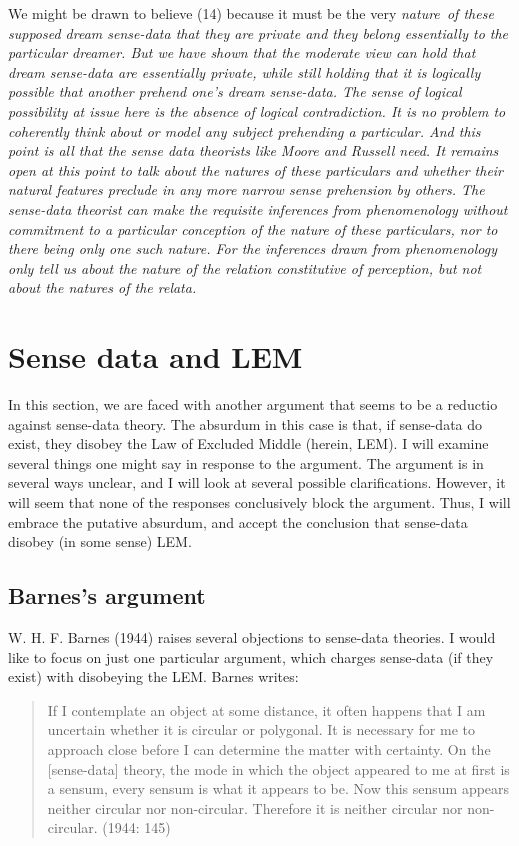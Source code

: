We might be drawn to believe (14) because it must be the very \em nature\em\ of these supposed dream sense-data that they are private and they belong essentially to the particular dreamer. But we have shown that the moderate view can hold that dream sense-data are essentially private, while still holding that it is logically possible that another prehend one's dream sense-data. The sense of logical possibility at issue here is the absence of logical contradiction. It is no problem to coherently think about or model any subject prehending a particular. And this point is all that the sense data theorists like Moore and Russell need. It remains open at this point to talk about the natures of these particulars and whether their natural features preclude in any more narrow sense prehension by others. The sense-data theorist can make the requisite inferences from phenomenology without commitment to a particular conception of the nature of these particulars, nor to there being only one such nature. For the inferences drawn from phenomenology only tell us about the nature of the relation constitutive of perception, but not about the natures of the relata.




\section{Sense data and LEM}\label{sdandlem}
In this section, we are faced with another argument that seems to be a reductio against sense-data theory. The absurdum in this case is that, if sense-data do exist, they disobey the Law of Excluded Middle (herein, LEM). I will examine several things one might say in response to the argument. The argument is in several ways unclear, and I will look at several possible clarifications. However, it will seem that none of the responses conclusively block the argument. Thus, I will embrace the putative absurdum, and accept the conclusion that sense-data disobey (in some sense) LEM. 

\subsection{Barnes's argument}

W. H. F. Barnes (1944) raises several objections to sense-data theories. I would like to focus on just one particular argument, which charges sense-data (if they exist) with disobeying the LEM. Barnes writes:

\begin{quote}
If I contemplate an object at some distance, it often happens that I am uncertain whether it is circular or polygonal. It is necessary for me to approach close before I can determine the matter with certainty. On the [sense-data] theory, the mode in which the object appeared to me at first is a sensum, every sensum is what it appears to be. Now this sensum appears neither circular nor non-circular. Therefore it is neither circular nor non-circular. (1944: 145)
\end{quote}

